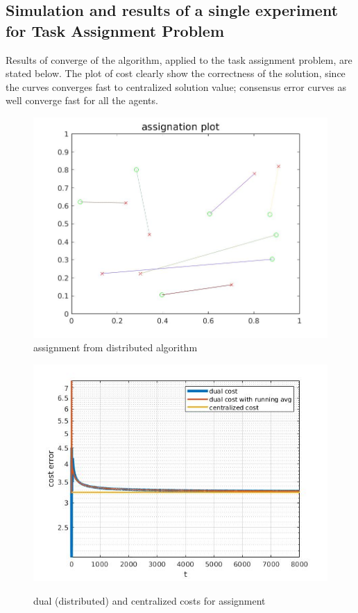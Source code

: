 \documentclass{article}
\begin{document}
\subsection{Simulation and results of a single experiment for Task Assignment Problem}
Results of converge of the algorithm, applied to the task assignment problem, are stated below.
The plot of cost  clearly show the correctness of the solution, since the curves converges fast to centralized solution value; consensus error curves as well converge fast for all the agents.

\begin{figure}[h!]
\caption{assignment from distributed algorithm}
\centering
 \includegraphics[scale=.38]{images/assign_N7seed_[0_0]_rep2_assiPlot.jpg}

\label{fig: assignment plot}
\end{figure}

\begin{figure}[h!]
\caption{dual (distributed) and centralized costs for assignment}
\centering
 \includegraphics[scale=.58]{images/assign_N7seed_[0_0]_rep2_Cost.jpg}
\label{fig: cost plot}
\end{figure}
\end{document}
